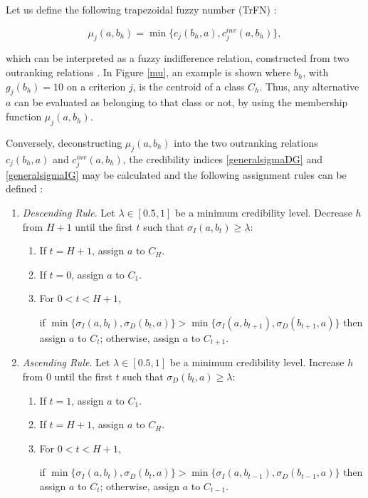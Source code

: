 \documentclass[]{elsarticle}
\theoremstyle{definition}
\begin{document}
Let us define the following trapezoidal fuzzy number (TrFN)  \citep{Ban2011}:

\begin{equation}
\mu_j(a,b_h)=\min\{c_j(b_h,a), c^{inv}_j(a,b_h)\},
\label{trfnmu}
\end{equation}


\noindent
which can be interpreted as a fuzzy indifference  relation, constructed from two outranking relations \citep{perny1992}. In Figure \ref{mu},  an example is shown where $b_h$, with $g_j(b_h)=10$ on a criterion $j$,  is the centroid of a class $C_h$. Thus, any alternative $a$ can be evaluated as belonging to that class or not, by using the membership function $\mu_j(a,b_h)$.

Conversely, deconstructing $\mu_j(a,b_h)$ into the two outranking relations $c_j(b_h,a)$ and  $c^{inv}_j(a,b_h)$, the credibility indices \eqref{generalsigmaDG} and \eqref{generalsigmaIG} may be calculated and the following assignment rules can be defined \citep{pereira2018}:

\begin{enumerate}
\item
\emph{Descending Rule}. Let $\lambda \in [0.5,1]$ be a minimum credibility level. Decrease $h$ from $H+1$ until the first $t$ such that $\sigma_I(a,b_t)\geq \lambda$:

\begin{enumerate}
\item
If $t=H+1$, assign $a$ to $C_H$.
\item
If $t=0$, assign $a$ to $C_1$.
\item
For $0<t<H+1$, 

if $\min\{\sigma_I(a,b_t),\sigma_D(b_t,a)\} > \min\{\sigma_I(a,b_{t+1}),\sigma_D(b_{t+1},a)\}$ then assign $a$ to $C_t$; otherwise, assign $a$ to $C_{t+1}$.
\end{enumerate} 

\item
\emph{Ascending Rule}. Let $\lambda \in [0.5,1]$ be a minimum credibility level. Increase $h$ from $0$ until the first $t$ such that $\sigma_D(b_t,a)\geq \lambda$:

\begin{enumerate}
\item
If $t=1$, assign $a$ to $C_1$.
\item
If $t=H+1$, assign $a$ to $C_H$.
\item
For $0<t<H+1$, 

if $\min\{\sigma_I(a,b_t),\sigma_D(b_t,a)\} > \min\{\sigma_I(a,b_{t-1}),\sigma_D(b_{t-1},a)\}$ then assign $a$ to $C_t$; otherwise, assign $a$ to $C_{t-1}$.
\end{enumerate} 
\end{enumerate}
\end{document}
